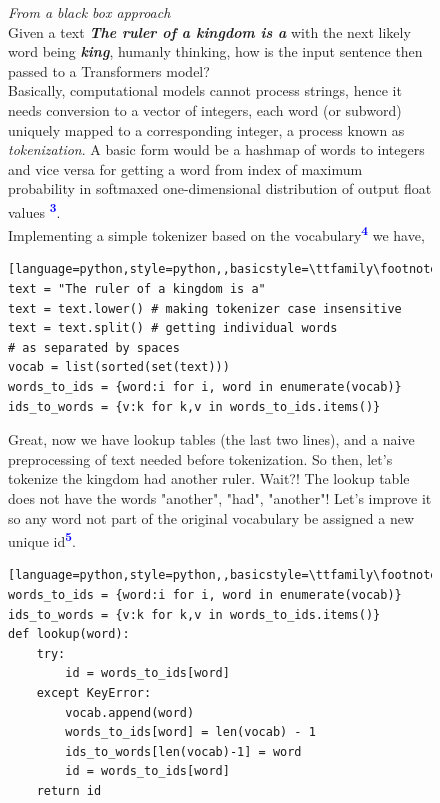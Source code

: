 \documentclass[12pt]{article}
\newcommand{\customtext}[3]{%
    \vspace{#2} %
    \fontsize{13}{8}\textcolor{#1}{\textit{#3}}%
}
\newcommand{\sidecite}[1]{\textsuperscript{\textcolor{blue}{\textbf{\scriptsize#1}}}}
\begin{document}
\begin{figure}[!htb]
    \begin{minipage}[t]{0.65\textwidth}
    \raggedright
    \customtext{xtitle}{0em}{From a black box approach}\\
    Given a text {\small \textit{\textbf{The ruler of a kingdom is a}}} with the next likely word 
    being \textit{\textbf{\small king}}, humanly thinking, how is the input sentence then passed to a 
    Transformers model?\\ 
    Basically, computational models cannot process strings, hence it needs conversion to a vector of integers, each word (or subword) 
    uniquely mapped to a corresponding integer, a process known as {\it tokenization}. A basic form 
    would be a hashmap of words to integers and vice versa for getting a word from index of maximum 
    probability in softmaxed one-dimensional distribution of output float values \sidecite{3}.\\
    \vspace{0.5em}
    Implementing a simple tokenizer based on the vocabulary\sidecite{4} we have, 
\begin{lstlisting}[language=python,style=python,,basicstyle=\ttfamily\footnotesize]
text = "The ruler of a kingdom is a"
text = text.lower() # making tokenizer case insensitive 
text = text.split() # getting individual words 
# as separated by spaces 
vocab = list(sorted(set(text)))
words_to_ids = {word:i for i, word in enumerate(vocab)}
ids_to_words = {v:k for k,v in words_to_ids.items()}
\end{lstlisting}
Great, now we have lookup tables (the last two lines), and a naive preprocessing of text needed 
before tokenization.  So then, let's tokenize \textcolor{xtitle}{the kingdom had another ruler}.
Wait?! The lookup table does not have the words \textcolor{xtitle}{"another", "had", "another"}! 
Let's improve it so any word not part of the original vocabulary be assigned a new unique id\sidecite{5}.
\begin{lstlisting}[language=python,style=python,,basicstyle=\ttfamily\footnotesize]
words_to_ids = {word:i for i, word in enumerate(vocab)}
ids_to_words = {v:k for k,v in words_to_ids.items()}
def lookup(word):
    try: 
        id = words_to_ids[word]
    except KeyError:
        vocab.append(word)
        words_to_ids[word] = len(vocab) - 1
        ids_to_words[len(vocab)-1] = word 
        id = words_to_ids[word]
    return id 
\end{lstlisting}
    \end{minipage}%

\end{figure}
\end{document}
